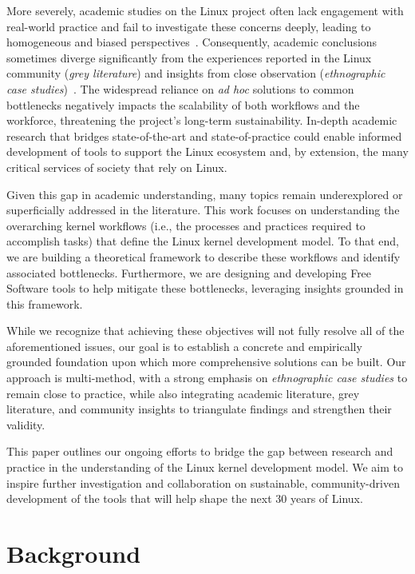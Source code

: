 \documentclass[sigconf]{acmart} %
\begin{document}
More severely, academic studies on the Linux project often lack engagement with
real-world practice and fail to investigate these concerns deeply, leading to
homogeneous and biased perspectives~\cite{wen2021-masterthesis}. Consequently,
academic conclusions sometimes diverge significantly from the experiences
reported in the Linux community (\textit{grey literature}) and insights from
close observation (\textit{ethnographic case
studies})~\cite{wen2021-masterthesis}. The widespread reliance on \textit{ad
hoc} solutions to common bottlenecks negatively impacts the scalability of both
workflows and the workforce, threatening the project's long-term sustainability.
In-depth academic research that bridges state-of-the-art and state-of-practice
could enable informed development of tools to support the Linux ecosystem and,
by extension, the many critical services of society that rely on Linux.

Given this gap in academic understanding, many topics remain underexplored or
superficially addressed in the literature. This work focuses on understanding
the overarching kernel workflows (i.e., the processes and practices required to
accomplish tasks) that define the Linux kernel development model. To that end,
we are building a theoretical framework to describe these workflows and identify
associated bottlenecks. Furthermore, we are designing and developing Free
Software tools to help mitigate these bottlenecks, leveraging insights grounded
in this framework.

While we recognize that achieving these objectives will not fully resolve all of
the aforementioned issues, our goal is to establish a concrete and empirically
grounded foundation upon which more comprehensive solutions can be built. Our
approach is multi-method, with a strong emphasis on \textit{ethnographic case
studies} to remain close to practice, while also integrating academic
literature, grey literature, and community insights to triangulate findings and
strengthen their validity.

This paper outlines our ongoing efforts to bridge the gap between research and
practice in the understanding of the Linux kernel development model. We aim to
inspire further investigation and collaboration on sustainable, community-driven
development of the tools that will help shape the next 30 years of Linux.

\section{Background}
\end{document}

